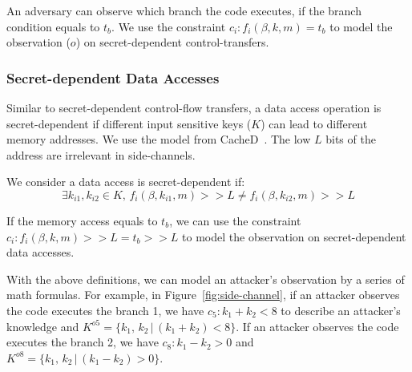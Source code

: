 An adversary can observe which branch the code executes, if the branch condition
equals to $t_b$. We use the constraint $c_i : f_i(\beta, k, m) = t_b$ to model
the observation ($o$) on secret-dependent control-transfers.

\subsubsection{Secret-dependent Data Accesses}
Similar to secret-dependent control-flow transfers, a data access operation is
secret-dependent if different input sensitive keys ($K$) can lead to different
memory addresses. We use the model from CacheD~\cite{203878}. The low $L$ bits
of the address are irrelevant in side-channels.

We consider a data access is secret-dependent if:
$$\exists k_{i1}, k_{i2} \in K, \,f_i(\beta, k_{i1}, m) >> L \neq f_i(\beta, k_{i2}, m) >> L$$

If the memory access equals to $t_b$, we can use the constraint $c_i :
f_i(\beta, k, m) >> L = t_b >> L$ to model the observation on secret-dependent
data accesses.

With the above definitions, we can model an attacker's observation by a series of math
formulas. For example, in Figure~\ref{fig:side-channel}, if an attacker observes
the code executes the branch 1, we have $c_5: k_1 + k_2 < 8$ to describe an
attacker's knowledge and $K^{o5} = \{k_1,\, k_2\,|\, (k_1 + k_2) < 8\}$. If an
attacker observes the code executes the branch 2, we have $c_8: k_1 - k_2 > 0$
and $K^{o8} = \{k_1,\, k_2\,|\, (k_1 - k_2) > 0\}$.

